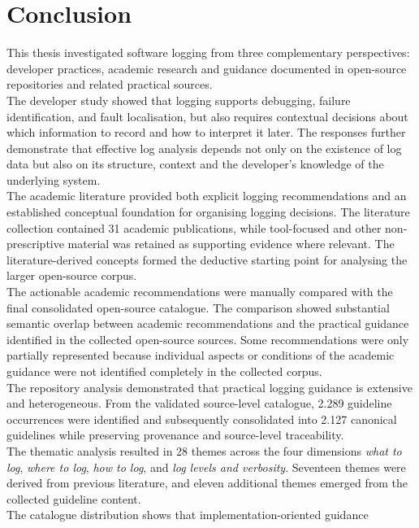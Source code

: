 \section{Conclusion}
This thesis investigated software logging from three complementary perspectives: 
developer practices, academic research and guidance documented in open-source
repositories and related practical sources.
\\
The developer study showed that logging supports debugging, failure identification, 
and fault localisation, but also requires contextual decisions about which information 
to record and how to interpret it later. The responses further 
demonstrate that effective log analysis depends not only on the existence of log data 
but also on its structure, context and the developer's knowledge of the underlying system.
\\
The academic literature provided both explicit logging recommendations and an
established conceptual foundation for organising logging decisions. The literature
collection contained 31 academic publications, while tool-focused and other
non-prescriptive material was retained as supporting evidence where relevant.
The literature-derived concepts formed the deductive starting point for analysing
the larger open-source corpus.
\\
The actionable academic recommendations were manually compared with the final
consolidated open-source catalogue. The comparison showed substantial semantic
overlap between academic recommendations and the practical guidance identified in
the collected open-source sources. Some recommendations were only partially
represented because individual aspects or conditions of the academic guidance were
not identified completely in the collected corpus.
\\
The repository analysis demonstrated that practical logging guidance is 
extensive and heterogeneous. From the validated source-level catalogue, 2.289 
guideline occurrences were identified and subsequently consolidated into 2.127 
canonical guidelines while preserving provenance and source-level traceability.
\\
The thematic analysis resulted in 28 themes across the four dimensions 
\textit{what to log}, \textit{where to log}, \textit{how to log}, and 
\textit{log levels and verbosity}. Seventeen themes were derived from 
previous literature, and eleven additional themes emerged from the collected guideline content.
\\
The catalogue distribution shows that implementation-oriented guidance 
